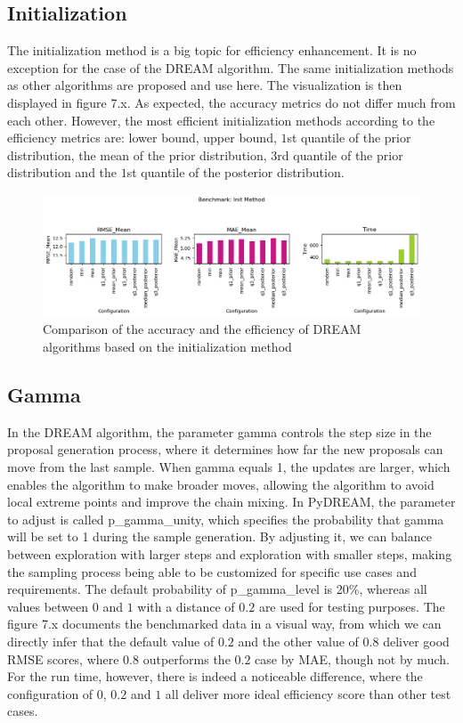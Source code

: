 \subsection{Initialization}
The initialization method is a big topic for efficiency enhancement. It is no exception for the case of the DREAM algorithm. The same initialization methods as other algorithms are proposed and use here. The visualization is then displayed in figure 7.x. As expected, the accuracy metrics do not differ much from each other. However, the most efficient initialization methods according to the efficiency metrics are: lower bound, upper bound, $1$st quantile of the prior distribution, the mean of the prior distribution, $3$rd quantile of the prior distribution and the $1$st quantile of the posterior distribution.
\begin{figure}[H]
    \centering
    \includegraphics[width=1\textwidth]{figures/dream/init.png}
    \captionsetup{width=.8\textwidth}
    \caption{Comparison of the accuracy and the efficiency of DREAM algorithms based on the initialization method}
    \label{fig:enter-label}
\end{figure}


\subsection{Gamma}
In the DREAM  algorithm, the parameter gamma controls the step size in the proposal generation process, where it determines how far the new proposals can move from the last sample. When gamma equals 1, the updates are larger, which enables the algorithm to make broader moves, allowing the algorithm to avoid local extreme points and improve the chain mixing. In PyDREAM, the parameter to adjust is called p\_gamma\_unity, which specifies the probability that gamma will be set to 1 during the sample generation. By adjusting it, we can balance between exploration with larger steps and exploration with smaller steps, making the sampling process being able to be customized for specific use cases and requirements. The default probability of p\_gamma\_level is 20\%, whereas all values between $0$ and $1$ with a distance of $0.2$ are used for testing purposes. The figure 7.x documents the benchmarked data in a visual way, from which we can directly infer that the default value of $0.2$ and the other value of $0.8$ deliver good RMSE scores, where $0.8$ outperforms the $0.2$ case by MAE, though not by much. For the run time, however, there is indeed a noticeable difference, where the configuration of $0$, $0.2$ and $1$ all deliver more ideal efficiency score than other test cases.

